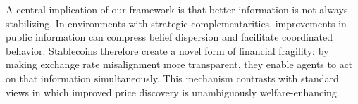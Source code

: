 A central implication of our framework is that better information is not always stabilizing. In environments with strategic complementarities, improvements in public information can compress belief dispersion and facilitate coordinated behavior. Stablecoins therefore create a novel form of financial fragility: by making exchange rate misalignment more transparent, they enable agents to act on that information simultaneously. This mechanism contrasts with standard views in which improved price discovery is unambiguously welfare-enhancing.
